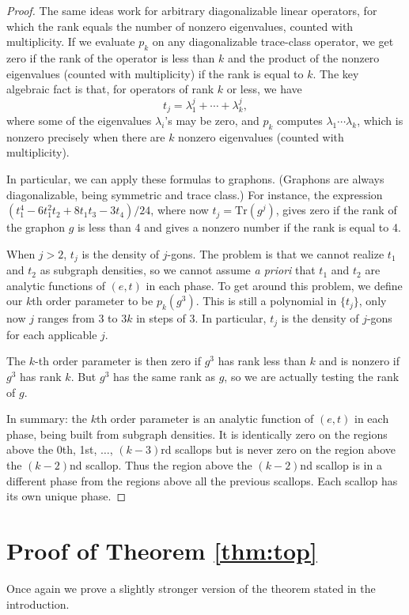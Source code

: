 \documentclass[12pt]{amsart}
\newcommand\TR{\mathrm{Tr}}
\newcommand\be{\begin{equation}}
\newcommand\ee{\end{equation}}
\begin{document}
{\begin{proof}
The same ideas work for arbitrary diagonalizable linear operators,
for which the rank equals the number of nonzero eigenvalues, counted
with multiplicity.
If we evaluate $p_k$ on any diagonalizable trace-class
operator,
we get zero if the rank of the operator is less than $k$ and the product of the
nonzero eigenvalues (counted with multiplicity) 
if the rank is equal to $k$. The key algebraic fact is that,
for operators of rank $k$ or less, we have 
\be t_j = \lambda_1^j + \cdots + \lambda_k^j, \ee
where some of the eigenvalues $\lambda_i$'s may be zero, 
and $p_k$ computes
$\lambda_1 \cdots \lambda_k$, which is nonzero precisely when there are 
$k$ nonzero eigenvalues (counted with multiplicity).  

In particular, we can 
apply these formulas to graphons. (Graphons are always diagonalizable, being symmetric and trace class.) 
For instance, the expression 
$(t_1^4 - 6 t_1^2 t_2 + 8 t_1 t_3 -3t_4)/24$, where now $t_j=\TR(g^j)$, 
gives zero if the rank of the graphon $g$ is less than 4 and gives a nonzero
number if the rank is equal to 4. 

When $j>2$, $t_j$ is the density of $j$-gons. The problem is that we cannot 
realize $t_1$ and $t_2$ as subgraph densities, so we cannot assume {\em a priori} that
$t_1$ and $t_2$ are analytic functions of $(e,t)$ in each phase. 
To get around this problem, we define our $k$th order parameter to be 
$p_k(g^3)$. This is still a polynomial in $\{t_j\}$, only now $j$ 
ranges from $3$ to $3k$ in steps of 3. 
In particular, $t_j$ is the density of $j$-gons for each applicable $j$. 

The $k$-th order parameter is then zero if $g^3$ has rank less than 
$k$ and is nonzero if $g^3$ has rank $k$. 
But $g^3$ has the same rank as $g$, so we are actually testing the 
rank of $g$. 

In summary: the $k$th order parameter is an analytic function of 
$(e,t)$ in each phase, being built from subgraph densities. It is identically
zero on the regions above the 0th, 1st, $\ldots$, $(k-3)$rd scallops but is never
zero on the region above the $(k-2)$nd scallop. Thus the region above the $(k-2)$nd
scallop is in a different phase from the regions above all the previous 
scallops. Each scallop has its own unique phase. 

\end{proof}

\section{Proof of Theorem \ref{thm:top}}
Once again we prove a slightly stronger version of the theorem
stated in the introduction. 

}
\end{document}
